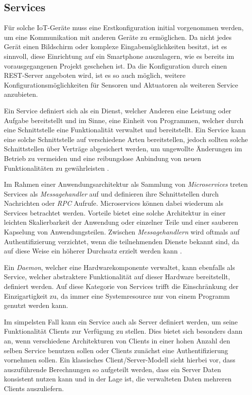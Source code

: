     \subsection{Services}
    Für solche IoT-Geräte muss eine Erstkonfiguration initial vorgenommen werden, um eine Kommunikation mit anderen Geräte zu ermöglichen. Da nicht jedes Gerät einen Bildschirm oder komplexe Eingabemöglichkeiten besitzt, ist es sinnvoll, diese Einrichtung auf ein Smartphone auszulagern, wie es bereits im vorausgegangenen Projekt geschehen ist. Da die Konfiguration durch einen REST-Server angeboten wird, ist es so auch möglich, weitere Konfigurationsmöglichkeiten für Sensoren und Aktuatoren als weiteren Service anzubieten.
    
    Ein Service definiert sich als ein Dienst, welcher Anderen eine Leistung oder Aufgabe bereitstellt und im Sinne, eine Einheit von Programmen, welcher durch eine Schnittstelle eine Funktionalität verwaltet und bereitstellt. Ein Service kann eine solche Schnittstelle auf verschiedene Arten bereitstellen, jedoch sollten solche Schnittstellen über Verträge abgesichert werden, um ungewollte Änderungen im Betrieb zu vermeiden und eine reibungslose Anbindung von neuen Funktionalitäten zu gewährleisten \cite[S.11]{finger}.
    
    Im Rahmen einer Anwendungsarchitektur als Sammlung von {\it Microservices} treten Services als {\it Messagehandler} auf und definieren ihre Schnittstellen durch Nachrichten oder {\it RPC} Aufrufe. Microservices können dabei wiederum als Services betrachtet werden. Vorteile bietet eine solche Architektur in einer leichten Skalierbarkeit der Anwendung oder einzelner Teile und einer sauberen Kapselung von Anwendungsteilen. Zwischen {\it Messagehandlern} wird oftmals auf Authentifizierung verzichtet, wenn die teilnehmenden Dienste bekannt sind, da auf diese Weise ein höherer Durchsatz erzielt werden kann \cite{microservices}.
    
    Ein {\it Daemon}, welcher eine Hardwarekomponente verwaltet, kann ebenfalls als Service, welcher abstraktere Funktionalität auf dieser Hardware bereitstellt, definiert werden. Auf diese Kategorie von Services trifft die Einschränkung der Einzigartigkeit zu, da immer eine Systemresource nur von einem Programm genutzt werden kann.
    
    Im simpelsten Fall kann ein Service auch als Server definiert werden, um seine Funktionalität Clients zur Verfügung zu stellen. Dies bietet sich besonders dann an, wenn verschiedene Architekturen von Clients in einer hohen Anzahl den selben Service benutzen sollen oder Clients zunächst eine Authentifizierung vornehmen sollen. 
    Ein klassisches Client/Server-Modell sieht hierbei vor, dass auszuführende Berechnungen so aufgeteilt werden, dass ein Server Daten konsistent nutzen kann und in der Lage ist, die verwalteten Daten mehreren Clients auszuliefern. \cite[S.8]{abts}
        
